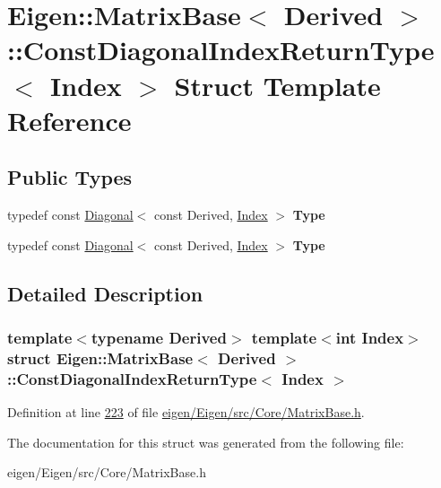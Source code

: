 \hypertarget{struct_eigen_1_1_matrix_base_1_1_const_diagonal_index_return_type}{}\section{Eigen\+:\+:Matrix\+Base$<$ Derived $>$\+:\+:Const\+Diagonal\+Index\+Return\+Type$<$ Index $>$ Struct Template Reference}
\label{struct_eigen_1_1_matrix_base_1_1_const_diagonal_index_return_type}
\subsection*{Public Types}
\begin{DoxyCompactItemize}
\item 
\mbox{\label{struct_eigen_1_1_matrix_base_1_1_const_diagonal_index_return_type_abb869f9b5b8910a80171a10b85bc8dd8}} 
typedef const \hyperlink{group___core___module_class_eigen_1_1_diagonal}{Diagonal}$<$ const Derived, \hyperlink{namespace_eigen_a62e77e0933482dafde8fe197d9a2cfde}{Index} $>$ {\bfseries Type}
\item 
\mbox{\label{struct_eigen_1_1_matrix_base_1_1_const_diagonal_index_return_type_abb869f9b5b8910a80171a10b85bc8dd8}} 
typedef const \hyperlink{group___core___module_class_eigen_1_1_diagonal}{Diagonal}$<$ const Derived, \hyperlink{namespace_eigen_a62e77e0933482dafde8fe197d9a2cfde}{Index} $>$ {\bfseries Type}
\end{DoxyCompactItemize}


\subsection{Detailed Description}
\subsubsection*{template$<$typename Derived$>$\newline
template$<$int Index$>$\newline
struct Eigen\+::\+Matrix\+Base$<$ Derived $>$\+::\+Const\+Diagonal\+Index\+Return\+Type$<$ Index $>$}



Definition at line \hyperlink{eigen_2_eigen_2src_2_core_2_matrix_base_8h_source_l00223}{223} of file \hyperlink{eigen_2_eigen_2src_2_core_2_matrix_base_8h_source}{eigen/\+Eigen/src/\+Core/\+Matrix\+Base.\+h}.



The documentation for this struct was generated from the following file\+:\begin{DoxyCompactItemize}
\item 
eigen/\+Eigen/src/\+Core/\+Matrix\+Base.\+h\end{DoxyCompactItemize}

